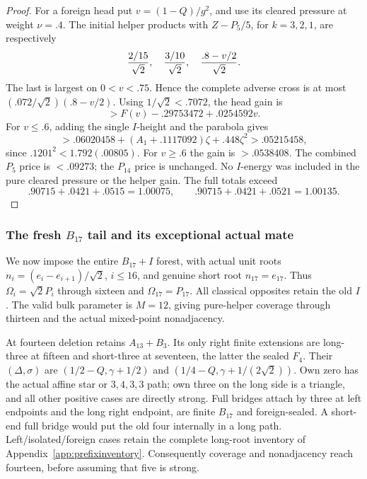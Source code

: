 \begin{proof}
For a foreign head put \(v=(1-Q)/g^2\), and use its cleared
pressure at weight \(\nu=.4\). The initial helper products with
\(Z-P_5/5\), for \(k=3,2,1\), are respectively
\[
 {2/15\over\sqrt2},\quad {3/10\over\sqrt2},\quad
 {.8-v/2\over\sqrt2}.
\]
The last is largest on \(0<v<.75\). Hence the complete adverse
cross is at most \((.072/\sqrt2)(.8-v/2)\).
Using \(1/\sqrt2<.7072\), the head gain is
\[
 >F(v)-.29753472+.0254592v.
\]
For \(v\le.6\), adding the single \(I\)-height and the parabola gives
\[
 >.06020458+(A_1+.1117092)\zeta+.448\zeta^2
 >.05215458,
\]
since \(.1201^2<1.792(.00805)\).
For \(v\ge.6\) the gain is \(>.0538408\).
The combined \(P_5\) price is \(<.09273\); the \(P_{14}\) price
is unchanged. No \(I\)-energy was included in the pure cleared
pressure or the helper gain. The full totals exceed
\[
 .90715+.0421+.0515=1.00075,\qquad
 .90715+.0421+.0521=1.00135 .
\]
\end{proof}

\subsubsection{The fresh \(B_{17}\) tail and its exceptional actual mate}
We now impose the entire \(B_{17}+I\) forest, with actual unit roots
\(n_i=(e_i-e_{i+1})/\sqrt2\), \(i\le16\), and genuine short
root \(n_{17}=e_{17}\). Thus
\(\Omega_i=\sqrt2P_i\) through sixteen and \(\Omega_{17}=P_{17}\).
All classical opposites retain the old \(I\).
The valid bulk parameter is \(M=12\), giving pure-helper coverage
through thirteen and the actual mixed-point nonadjacency.

At fourteen deletion retains \(A_{13}+B_3\).
Its only right finite extensions are long-three at fifteen and
short-three at seventeen, the latter the sealed \(F_4\).
Their \((\Delta,\sigma)\) are
\((1/2-Q,\gamma+1/2)\) and
\((1/4-Q,\gamma+1/(2\sqrt2))\).
Own zero has the actual affine star or \(3,4,3,3\) path;
own three on the long side is a triangle, and all other positive
cases are directly strong. Full bridges attach by three at left
endpoints and the long right endpoint, are finite \(B_{17}\) and
foreign-sealed. A short-end full bridge would put the old four
internally in a long path. Left/isolated/foreign cases retain the
complete long-root inventory of Appendix~\ref{app:prefixinventory}.
Consequently coverage and nonadjacency reach fourteen, before
assuming that five is strong.

